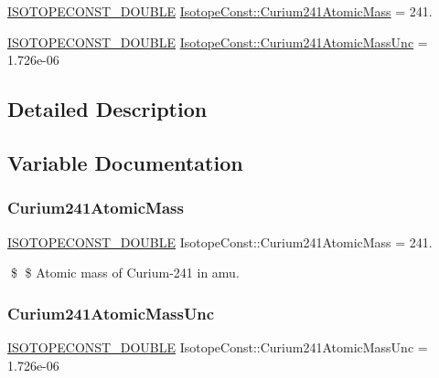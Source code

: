 \begin{DoxyCompactItemize}
\item 
\mbox{\hyperlink{group___isotope_const-_macros_ga8f45a7272ce02c0b4c65c44636ed719a}{I\+S\+O\+T\+O\+P\+E\+C\+O\+N\+S\+T\+\_\+\+D\+O\+U\+B\+LE}} \mbox{\hyperlink{group___isotope_const-_curium-_cm241_ga81921b7df8200a1677e2ed81f40cc0b3}{Isotope\+Const\+::\+Curium241\+Atomic\+Mass}} = 241.
\item 
\mbox{\hyperlink{group___isotope_const-_macros_ga8f45a7272ce02c0b4c65c44636ed719a}{I\+S\+O\+T\+O\+P\+E\+C\+O\+N\+S\+T\+\_\+\+D\+O\+U\+B\+LE}} \mbox{\hyperlink{group___isotope_const-_curium-_cm241_gacb69cdcf1bc3f102479556bc20d14b55}{Isotope\+Const\+::\+Curium241\+Atomic\+Mass\+Unc}} = 1.\+726e-\/06
\end{DoxyCompactItemize}


\subsection{Detailed Description}


\subsection{Variable Documentation}
\mbox{\label{group___isotope_const-_curium-_cm241_ga81921b7df8200a1677e2ed81f40cc0b3}} 
\subsubsection{\texorpdfstring{Curium241\+Atomic\+Mass}{Curium241AtomicMass}}
{\footnotesize\ttfamily \mbox{\hyperlink{group___isotope_const-_macros_ga8f45a7272ce02c0b4c65c44636ed719a}{I\+S\+O\+T\+O\+P\+E\+C\+O\+N\+S\+T\+\_\+\+D\+O\+U\+B\+LE}} Isotope\+Const\+::\+Curium241\+Atomic\+Mass = 241.}

\$ \$ Atomic mass of Curium-\/241 in amu. \mbox{\label{group___isotope_const-_curium-_cm241_gacb69cdcf1bc3f102479556bc20d14b55}} 
\subsubsection{\texorpdfstring{Curium241\+Atomic\+Mass\+Unc}{Curium241AtomicMassUnc}}
{\footnotesize\ttfamily \mbox{\hyperlink{group___isotope_const-_macros_ga8f45a7272ce02c0b4c65c44636ed719a}{I\+S\+O\+T\+O\+P\+E\+C\+O\+N\+S\+T\+\_\+\+D\+O\+U\+B\+LE}} Isotope\+Const\+::\+Curium241\+Atomic\+Mass\+Unc = 1.\+726e-\/06}

